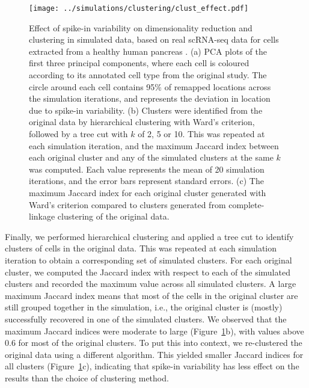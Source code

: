\documentclass{article}
\begin{document}
\begin{figure}[btp]
    \begin{center}
        \texttt{[image: ../simulations/clustering/clust\_effect.pdf]}
    \end{center}
    \caption{Effect of spike-in variability on dimensionality reduction and clustering in simulated data,
        based on real scRNA-seq data for cells extracted from a healthy human pancreas \citep{segerstople2016single}.
        (a) PCA plots of the first three principal components, where each cell is coloured according to its annotated cell type from the original study. 
        The circle around each cell contains 95\% of remapped locations across the simulation iterations, and represents the deviation in location due to spike-in variability.
        (b) Clusters were identified from the original data by hierarchical clustering with Ward's criterion, followed by a tree cut with $k$ of 2, 5 or 10.
        This was repeated at each simulation iteration, and the maximum Jaccard index between each original cluster and any of the simulated clusters at the same $k$ was computed.
        Each value represents the mean of 20 simulation iterations, and the error bars represent standard errors.
        (c) The maximum Jaccard index for each original cluster generated with Ward's criterion compared to clusters generated from complete-linkage clustering of the original data.
    }
    \label{fig:dimclust}
\end{figure}

Finally, we performed hierarchical clustering and applied a tree cut to identify clusters of cells in the original data.
This was repeated at each simulation iteration to obtain a corresponding set of simulated clusters.
For each original cluster, we computed the Jaccard index with respect to each of the simulated clusters and recorded the maximum value across all simulated clusters.
A large maximum Jaccard index means that most of the cells in the original cluster are still grouped together in the simulation,
i.e., the original cluster is (mostly) successfully recovered in one of the simulated clusters.
We observed that the maximum Jaccard indices were moderate to large (Figure~\ref{fig:dimclust}b), with values above 0.6 for most of the original clusters.
To put this into context, we re-clustered the original data using a different algorithm.
This yielded smaller Jaccard indices for all clusters (Figure~\ref{fig:dimclust}c), indicating that spike-in variability has less effect on the results than the choice of clustering method.
\end{document}
